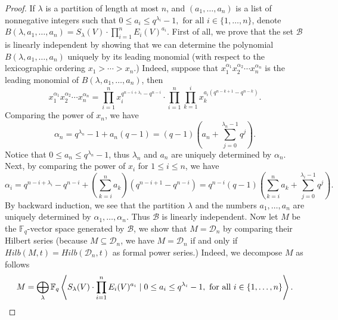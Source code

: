 \documentclass[12pt,a4paper]{report}
\theoremstyle{definition}
\theoremstyle{remark}
\theoremstyle{definition}
\begin{document}
\begin{proof}
    If $\lambda$ is a partition of length at most $n$, and $(a_1, \ldots, a_n)$ is a list of nonnegative integers such that $0\leq a_i\leq q^{\lambda_i} - 1, \text{ for all } i\in \{1,\ldots, n\}$, denote $B(\lambda, a_1,\ldots, a_n) = S_\lambda(V) \cdot \prod\limits_{i=1}^{n}E_i(V)^{a_i}$.
    First of all, we prove that the set $\mathcal{B}$ is linearly independent by showing that we can determine the polynomial $B(\lambda, a_1, \ldots, a_n)$ uniquely by its leading monomial (with respect to the lexicographic ordering $x_1 > \cdots > x_n$.) Indeed, suppose that $x_1^{\alpha_1}x_2^{\alpha_2}\cdots x_n^{\alpha_n}$ is the leading monomial of $B(\lambda, a_1, \ldots, a_n)$, then \begin{equation*}
        x_1^{\alpha_1}x_2^{\alpha_2}\cdots x_n^{\alpha_n} = \prod\limits_{i=1}^{n}x_i^{q^{n-i + \lambda_i} - q^{n-i}} \cdot \prod\limits_{i=1}^{n}\prod\limits_{k=1}^{i}x_k^{a_i(q^{n-k+1} - q^{n-k})}.
    \end{equation*} Comparing the power of $x_n$, we have
    \begin{equation*}
        \alpha_n = q^{\lambda_n} - 1 + a_n(q-1) = (q-1)(a_n + \sum\limits_{j=0}^{\lambda_n - 1} q^j).
    \end{equation*}
    Notice that $0\leq a_n\leq q^{\lambda_n}-1$, thus $\lambda_n$ and $a_n$ are uniquely determined by $\alpha_n$. Next, by comparing the power of $x_{i}$ for $1\leq i\leq n$, we have
    \begin{equation*}
        \alpha_i = q^{n-i+\lambda_{i}} - q^{n-i} + \left(\sum\limits_{k = i}^{n} a_k\right)(q^{n-i+1} - q^{n-i}) =q^{n-i}(q-1)\left(\sum\limits_{k = i}^{n} a_k + \sum\limits_{j=0}^{\lambda_i - 1} q^j\right).
    \end{equation*}
    By backward induction, we see that the partition $\lambda$ and the numbers $a_1, \ldots, a_n$ are uniquely determined by $\alpha_1, \ldots, \alpha_n$. Thus $\mathcal{B}$ is linearly independent. Now let $M$ be the $\mathbb{F}_q$-vector space generated by $\mathcal{B}$, we show that $M = \mathcal{D}_n$ by comparing their Hilbert series (because $M\subseteq \mathcal{D}_n$, we have $M=\mathcal{D}_n$ if and only if $Hilb(M, t) = Hilb(\mathcal{D}_n, t)$ as formal power series.) Indeed, we decompose $M$ as follows
    \begin{equation*}
        M = \bigoplus\limits_{\lambda}\mathbb{F}_q\left\langle S_\lambda(V) \cdot \prod\limits_{i=1}^{n}E_i(V)^{a_i} \hspace{0.1cm}|\hspace{0.1cm} 0\leq a_i\leq q^{\lambda_i} - 1, \text{ for all } i\in \{1,\ldots, n\}\right\rangle.

\end{equation*}
\end{proof}
\end{document}
